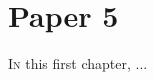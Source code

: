 \chapter{Paper 5}

\vspace*{-2.2em}
\minitoc
\vspace*{0.8em}

\lettrine[lines=3]{I}{n} this first chapter, ...




